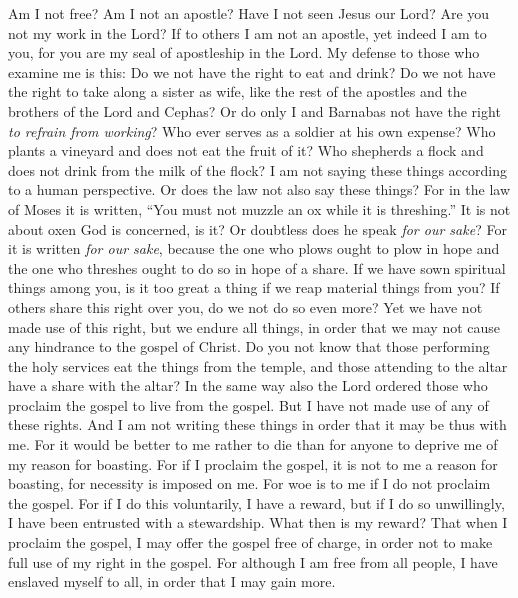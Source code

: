 \begin{biblechapter} %
 Am I not free? Am I not an apostle? Have I not seen Jesus our Lord? Are you not my work in the Lord?
\verse If to others I am not an apostle, yet indeed I am to you, for you are my seal of apostleship in the Lord.
\verse My defense to those who examine me is this:
\verse Do we not have the right to eat and drink?
\verse Do we not have the right to take along a sister as wife, like the rest of the apostles and the brothers of the Lord and Cephas?
\verse Or do only I and Barnabas not have the right \textit{to refrain from working}?
\verse Who ever serves as a soldier at his own expense? Who plants a vineyard and does not eat the fruit of it? Who shepherds a flock and does not drink from the milk of the flock?
\verse I am not saying these things according to a human perspective. Or does the law not also say these things?
\verse For in the law of Moses it is written, “You must not muzzle an ox while it is threshing.” It is not about oxen God is concerned, is it?
\verse Or doubtless does he speak \textit{for our sake}? For it is written \textit{for our sake}, because the one who plows ought to plow in hope and the one who threshes ought to do so in hope of a share.
\verse If we have sown spiritual things among you, is it too great a thing if we reap material things from you?
\verse If others share this right over you, do we not do so even more? Yet we have not made use of this right, but we endure all things, in order that we may not cause any hindrance to the gospel of Christ.
\verse Do you not know that those performing the holy services eat the things from the temple, and those attending to the altar have a share with the altar?
\verse In the same way also the Lord ordered those who proclaim the gospel to live from the gospel.
\verse But I have not made use of any of these rights. And I am not writing these things in order that it may be thus with me. For it would be better to me rather to die than for anyone to deprive me of my reason for boasting.
\verse For if I proclaim the gospel, it is not to me a reason for boasting, for necessity is imposed on me. For woe is to me if I do not proclaim the gospel.
\verse For if I do this voluntarily, I have a reward, but if I do so unwillingly, I have been entrusted with a stewardship.
\verse What then is my reward? That when I proclaim the gospel, I may offer the gospel free of charge, in order not to make full use of my right in the gospel.
\verse For although I am free from all people, I have enslaved myself to all, in order that I may gain more.

\end{biblechapter}
